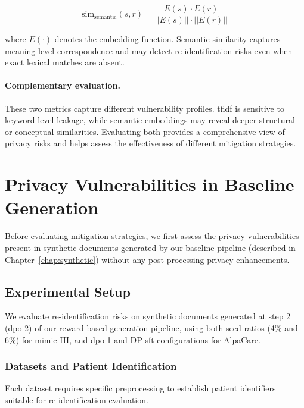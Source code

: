 \begin{equation}
    \text{sim}_{\text{semantic}}(s, r) = \frac{E(s) \cdot E(r)}{||E(s)|| \cdot ||E(r)||}
\end{equation}

where $E(\cdot)$ denotes the embedding function. Semantic similarity captures meaning-level correspondence and may detect re-identification risks even when exact lexical matches are absent.


\paragraph{Complementary evaluation.} These two metrics capture different vulnerability profiles. \gls{tfidf} is sensitive to keyword-level leakage, while semantic embeddings may reveal deeper structural or conceptual similarities. Evaluating both provides a comprehensive view of privacy risks and helps assess the effectiveness of different mitigation strategies.

\section{Privacy Vulnerabilities in Baseline Generation}
\label{sec:baseline_vulnerabilities}

Before evaluating mitigation strategies, we first assess the privacy vulnerabilities present in synthetic documents generated by our baseline pipeline (described in Chapter~\ref{chap:synthetic}) without any post-processing privacy enhancements.

\subsection{Experimental Setup}

We evaluate re-identification risks on synthetic documents generated at step 2 (\gls{dpo}-2) of our reward-based generation pipeline, using both seed ratios (4\% and 6\%) for \gls{mimic}-III, and \gls{dpo}-1 and DP-\gls{sft} configurations for AlpaCare.

\subsubsection{Datasets and Patient Identification}

Each dataset requires specific preprocessing to establish patient identifiers suitable for re-identification evaluation.

